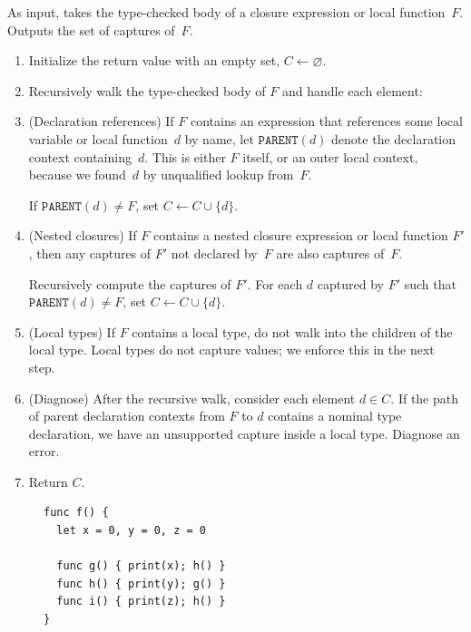 \documentclass[../generics]{subfiles}
\begin{document}
\begin{algorithm}\label{closure captures algorithm}
As input, takes the type-checked body of a closure expression or local function~$F$. Outputs the set of captures of~$F$.
\begin{enumerate}
\item Initialize the return value with an empty set, $C\leftarrow\varnothing$.
\item Recursively walk the type-checked body of $F$ and handle each element:
\item (Declaration references) If $F$ contains an expression that references some local variable or local function~$d$ by name, let $\texttt{PARENT}(d)$ denote the declaration context containing~$d$. This is either $F$ itself, or an outer local context, because we found~$d$ by unqualified lookup from~$F$.

If $\texttt{PARENT}(d)\neq F$, set $C\leftarrow C\cup\{d\}$.
\item (Nested closures) If $F$ contains a nested closure expression or local function $F'\!$, then any captures of $F'$ not declared by~$F$ are also captures of~$F$.

Recursively compute the captures of $F'\!$. For each $d$ captured by $F'$ such that $\texttt{PARENT}(d)\neq F$, set $C\leftarrow C\cup\{d\}$.

\item (Local types) If $F$ contains a local type, do not walk into the children of the local type. Local types do not capture values; we enforce this in the next step.

\item (Diagnose) After the recursive walk, consider each element $d\in C$. If the path of parent declaration contexts from $F$ to $d$ contains a nominal type declaration, we have an unsupported capture inside a local type. Diagnose an error.

\item Return $C$.
\end{enumerate}
\end{algorithm}

\begin{figure}
\begin{minipage}{16.5em}
\begin{Verbatim}
func f() {
  let x = 0, y = 0, z = 0

  func g() { print(x); h() }
  func h() { print(y); g() }
  func i() { print(z); h() }
}
\end{Verbatim}
\end{minipage}
\end{figure}
\end{document}
